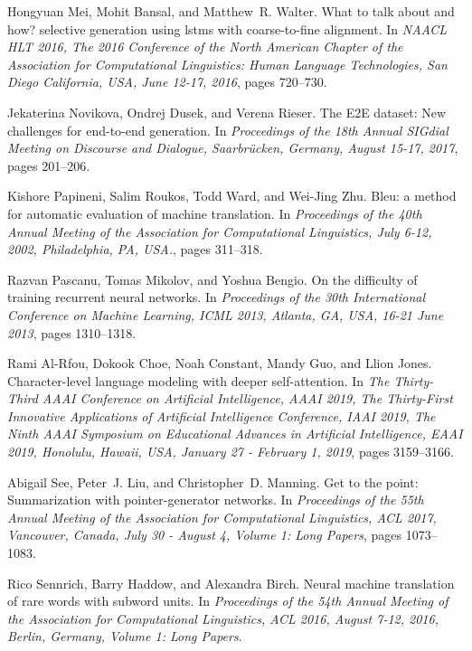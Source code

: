 \documentclass[runningheads, envcountsame, a4paper]{llncs}
\begin{document}
\begin{thebibliography}{10}
Hongyuan Mei, Mohit Bansal, and Matthew~R. Walter.
\newblock What to talk about and how? selective generation using lstms with
  coarse-to-fine alignment.
\newblock In {\em {NAACL} {HLT} 2016, The 2016 Conference of the North American
  Chapter of the Association for Computational Linguistics: Human Language
  Technologies, San Diego California, USA, June 12-17, 2016}, pages 720--730.

Jekaterina Novikova, Ondrej Dusek, and Verena Rieser.
\newblock The {E2E} dataset: New challenges for end-to-end generation.
\newblock In {\em Proceedings of the 18th Annual SIGdial Meeting on Discourse
  and Dialogue, Saarbrücken, Germany, August 15-17, 2017}, pages 201--206.

Kishore Papineni, Salim Roukos, Todd Ward, and Wei-Jing Zhu.
\newblock Bleu: a method for automatic evaluation of machine translation.
\newblock In {\em Proceedings of the 40th Annual Meeting of the Association for
  Computational Linguistics, July 6-12, 2002, Philadelphia, PA, {USA.}}, pages
  311--318.

Razvan Pascanu, Tomas Mikolov, and Yoshua Bengio.
\newblock On the difficulty of training recurrent neural networks.
\newblock In {\em Proceedings of the 30th International Conference on Machine
  Learning, {ICML} 2013, Atlanta, GA, USA, 16-21 June 2013}, pages 1310--1318.

Rami Al-Rfou, Dokook Choe, Noah Constant, Mandy Guo, and Llion Jones.
\newblock Character-level language modeling with deeper self-attention.
\newblock In {\em The Thirty-Third {AAAI} Conference on Artificial
  Intelligence, {AAAI} 2019, The Thirty-First Innovative Applications of
  Artificial Intelligence Conference, {IAAI} 2019, The Ninth {AAAI} Symposium
  on Educational Advances in Artificial Intelligence, {EAAI} 2019, Honolulu,
  Hawaii, USA, January 27 - February 1, 2019}, pages 3159--3166.

Abigail See, Peter~J. Liu, and Christopher~D. Manning.
\newblock Get to the point: Summarization with pointer-generator networks.
\newblock In {\em Proceedings of the 55th Annual Meeting of the Association for
  Computational Linguistics, {ACL} 2017, Vancouver, Canada, July 30 - August 4,
  Volume 1: Long Papers}, pages 1073--1083.

Rico Sennrich, Barry Haddow, and Alexandra Birch.
\newblock Neural machine translation of rare words with subword units.
\newblock In {\em Proceedings of the 54th Annual Meeting of the Association for
  Computational Linguistics, {ACL} 2016, August 7-12, 2016, Berlin, Germany,
  Volume 1: Long Papers}.


\end{thebibliography}
\end{document}
